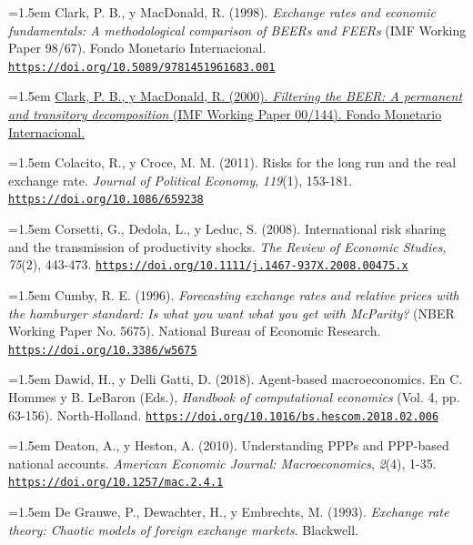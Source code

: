 \documentclass[10pt,a4paper]{article}
\begin{document}
\begin{sloppypar}\noindent\hangindent=1.5em Clark, P. B., y MacDonald, R. (1998). \textit{Exchange rates and economic fundamentals: A methodological comparison of BEERs and FEERs} (IMF Working Paper 98/67). Fondo Monetario Internacional. \href{https://doi.org/10.5089/9781451961683.001}{\nolinkurl{https://doi.org/10.5089/9781451961683.001}}\end{sloppypar}

\noindent\hangindent=1.5em \href{https://www.imf.org/external/pubs/cat/longres.aspx?sk=3720.0}{Clark, P. B., y MacDonald, R. (2000). \textit{Filtering the BEER: A permanent and transitory decomposition} (IMF Working Paper 00/144). Fondo Monetario Internacional.}

\noindent\hangindent=1.5em Colacito, R., y Croce, M. M. (2011). Risks for the long run and the real exchange rate. \textit{Journal of Political Economy}, \textit{119}(1), 153-181. \href{https://doi.org/10.1086/659238}{\nolinkurl{https://doi.org/10.1086/659238}}

\noindent\hangindent=1.5em Corsetti, G., Dedola, L., y Leduc, S. (2008). International risk sharing and the transmission of productivity shocks. \textit{The Review of Economic Studies}, \textit{75}(2), 443-473. \href{https://doi.org/10.1111/j.1467-937X.2008.00475.x}{\nolinkurl{https://doi.org/10.1111/j.1467-937X.2008.00475.x}}

\noindent\hangindent=1.5em Cumby, R. E. (1996). \textit{Forecasting exchange rates and relative prices with the hamburger standard: Is what you want what you get with McParity?} (NBER Working Paper No. 5675). National Bureau of Economic Research. \href{https://doi.org/10.3386/w5675}{\nolinkurl{https://doi.org/10.3386/w5675}}

\noindent\hangindent=1.5em Dawid, H., y Delli Gatti, D. (2018). Agent-based macroeconomics. En C. Hommes y B. LeBaron (Eds.), \textit{Handbook of computational economics} (Vol. 4, pp. 63-156). North-Holland. \href{https://doi.org/10.1016/bs.hescom.2018.02.006}{\nolinkurl{https://doi.org/10.1016/bs.hescom.2018.02.006}}

\noindent\hangindent=1.5em Deaton, A., y Heston, A. (2010). Understanding PPPs and PPP-based national accounts. \textit{American Economic Journal: Macroeconomics}, \textit{2}(4), 1-35. \href{https://doi.org/10.1257/mac.2.4.1}{\nolinkurl{https://doi.org/10.1257/mac.2.4.1}}

\noindent\hangindent=1.5em De Grauwe, P., Dewachter, H., y Embrechts, M. (1993). \textit{Exchange rate theory: Chaotic models of foreign exchange markets}. Blackwell.
\end{document}
